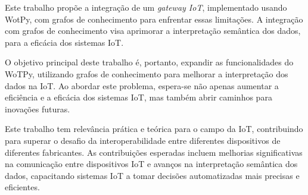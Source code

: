Este trabalho propõe a integração de um \textit{gateway IoT}, implementado usando WotPy, com grafos de conhecimento para enfrentar essas limitações. A integração com grafos de conhecimento visa aprimorar a interpretação semântica dos dados, para a eficácia dos sistemas IoT.

O objetivo principal deste trabalho é, portanto, expandir as funcionalidades do WoTPy, utilizando grafos de conhecimento para melhorar a interpretação dos dados na IoT. Ao abordar este problema, espera-se não apenas aumentar a eficiência e a eficácia dos sistemas IoT, mas também abrir caminhos para inovações futuras.

Este trabalho tem relevância prática e teórica para o campo da IoT, contribuindo para superar o desafio da interoperabilidade entre diferentes dispositivos de diferentes fabricantes. As contribuições esperadas incluem melhorias significativas na comunicação entre dispositivos IoT e avanços na interpretação semântica dos dados, capacitando sistemas IoT a tomar decisões automatizadas mais precisas e eficientes.
